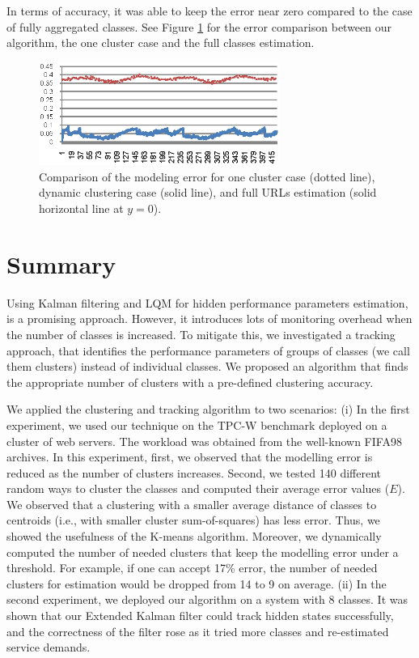 In terms of accuracy, it was able to keep the error near zero compared to the case of fully aggregated classes. See Figure \ref{fig:comparison-of-modeling-error} for the error comparison between our algorithm, the one cluster case and the full classes estimation. 
\begin{figure}[h]
	\centering
	\includegraphics[width=0.7\textwidth]{image/comparison-modeling-error-one-cluster-dynamic.eps}
	\caption[Comparison of the modeling error for one cluster case, dynamic clustering case, and full classes estimation.]{Comparison of the modeling error for one cluster case (dotted line), dynamic clustering case (solid line), and full URLs estimation (solid horizontal line at $y=0$).}
	\label{fig:comparison-of-modeling-error}
\end{figure}

\section{Summary} 
\label{sec:conclusions-and-future-work} 
   Using Kalman filtering and LQM for hidden performance parameters estimation, is a promising approach. However, it introduces lots of monitoring overhead when the number of classes is increased. To mitigate this, we investigated a tracking approach, that identifies the performance parameters of groups of classes (we call them clusters) instead of individual classes. We proposed an algorithm that finds the appropriate number of clusters with a pre-defined clustering accuracy. 

We applied the clustering and tracking algorithm to two scenarios: 
(i) In the first experiment, we used our technique on the TPC-W benchmark deployed on a cluster of web servers. The workload was obtained from the well-known FIFA98 archives. In this experiment, first, we observed that the modelling error is reduced as the number of clusters increases. Second, we tested 140 different random ways to cluster the classes and computed their average error values ($E$). We observed that a clustering with a smaller average distance of classes to centroids (i.e., with smaller cluster sum-of-squares) has less error. Thus, we showed the usefulness of the K-means algorithm. Moreover, we dynamically computed the number of needed clusters that keep the modelling error under a threshold. For example, if one can accept 17\% error, the number of needed clusters for estimation would be dropped from 14 to 9 on average.
(ii) In the second experiment, we deployed our algorithm on a system with 8 classes. It was shown that our Extended Kalman filter could track hidden states successfully, and the correctness of the filter rose as it tried more classes and re-estimated service demands.







